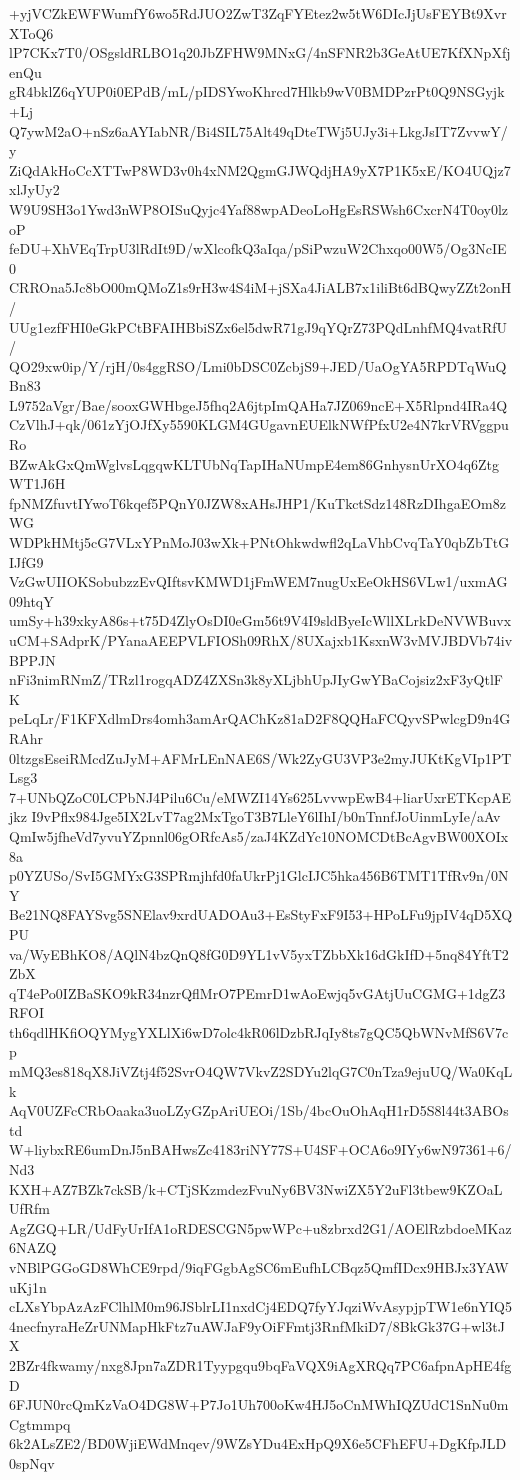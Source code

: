 +yjVCZkEWFWumfY6wo5RdJUO2ZwT3ZqFYEtez2w5tW6DIcJjUsFEYBt9XvrXToQ6
lP7CKx7T0/OSgsldRLBO1q20JbZFHW9MNxG/4nSFNR2b3GeAtUE7KfXNpXfjenQu
gR4bklZ6qYUP0i0EPdB/mL/pIDSYwoKhrcd7Hlkb9wV0BMDPzrPt0Q9NSGyjk+Lj
Q7ywM2aO+nSz6aAYIabNR/Bi4SIL75Alt49qDteTWj5UJy3i+LkgJsIT7ZvvwY/y
ZiQdAkHoCcXTTwP8WD3v0h4xNM2QgmGJWQdjHA9yX7P1K5xE/KO4UQjz7xlJyUy2
W9U9SH3o1Ywd3nWP8OISuQyjc4Yaf88wpADeoLoHgEsRSWsh6CxcrN4T0oy0lzoP
feDU+XhVEqTrpU3lRdIt9D/wXlcofkQ3aIqa/pSiPwzuW2Chxqo00W5/Og3NcIE0
CRROna5Jc8bO00mQMoZ1s9rH3w4S4iM+jSXa4JiALB7x1iliBt6dBQwyZZt2onH/
UUg1ezfFHI0eGkPCtBFAIHBbiSZx6el5dwR71gJ9qYQrZ73PQdLnhfMQ4vatRfU/
QO29xw0ip/Y/rjH/0s4ggRSO/Lmi0bDSC0ZcbjS9+JED/UaOgYA5RPDTqWuQBn83
L9752aVgr/Bae/sooxGWHbgeJ5fhq2A6jtpImQAHa7JZ069ncE+X5Rlpnd4IRa4Q
CzVlhJ+qk/061zYjOJfXy5590KLGM4GUgavnEUElkNWfPfxU2e4N7krVRVggpuRo
BZwAkGxQmWglvsLqgqwKLTUbNqTapIHaNUmpE4em86GnhysnUrXO4q6ZtgWT1J6H
fpNMZfuvtIYwoT6kqef5PQnY0JZW8xAHsJHP1/KuTkctSdz148RzDIhgaEOm8zWG
WDPkHMtj5cG7VLxYPnMoJ03wXk+PNtOhkwdwfl2qLaVhbCvqTaY0qbZbTtGIJfG9
VzGwUIIOKSobubzzEvQIftsvKMWD1jFmWEM7nugUxEeOkHS6VLw1/uxmAG09htqY
umSy+h39xkyA86s+t75D4ZlyOsDI0eGm56t9V4I9sldByeIcWllXLrkDeNVWBuvx
uCM+SAdprK/PYanaAEEPVLFIOSh09RhX/8UXajxb1KsxnW3vMVJBDVb74ivBPPJN
nFi3nimRNmZ/TRzl1rogqADZ4ZXSn3k8yXLjbhUpJIyGwYBaCojsiz2xF3yQtlFK
peLqLr/F1KFXdlmDrs4omh3amArQAChKz81aD2F8QQHaFCQyvSPwlcgD9n4GRAhr
0ltzgsEseiRMcdZuJyM+AFMrLEnNAE6S/Wk2ZyGU3VP3e2myJUKtKgVIp1PTLsg3
7+UNbQZoC0LCPbNJ4Pilu6Cu/eMWZI14Ys625LvvwpEwB4+liarUxrETKcpAEjkz
I9vPflx984Jge5IX2LvT7ag2MxTgoT3B7LleY6lIhI/b0nTnnfJoUinmLyIe/aAv
QmIw5jfheVd7yvuYZpnnl06gORfcAs5/zaJ4KZdYc10NOMCDtBcAgvBW00XOIx8a
p0YZUSo/SvI5GMYxG3SPRmjhfd0faUkrPj1GlcIJC5hka456B6TMT1TfRv9n/0NY
Be21NQ8FAYSvg5SNElav9xrdUADOAu3+EsStyFxF9I53+HPoLFu9jpIV4qD5XQPU
va/WyEBhKO8/AQlN4bzQnQ8fG0D9YL1vV5yxTZbbXk16dGkIfD+5nq84YftT2ZbX
qT4ePo0IZBaSKO9kR34nzrQflMrO7PEmrD1wAoEwjq5vGAtjUuCGMG+1dgZ3RFOI
th6qdlHKfiOQYMygYXLlXi6wD7olc4kR06lDzbRJqIy8ts7gQC5QbWNvMfS6V7cp
mMQ3es818qX8JiVZtj4f52SvrO4QW7VkvZ2SDYu2lqG7C0nTza9ejuUQ/Wa0KqLk
AqV0UZFcCRbOaaka3uoLZyGZpAriUEOi/1Sb/4bcOuOhAqH1rD5S8l44t3ABOstd
W+liybxRE6umDnJ5nBAHwsZc4183riNY77S+U4SF+OCA6o9IYy6wN97361+6/Nd3
KXH+AZ7BZk7ckSB/k+CTjSKzmdezFvuNy6BV3NwiZX5Y2uFl3tbew9KZOaLUfRfm
AgZGQ+LR/UdFyUrIfA1oRDESCGN5pwWPc+u8zbrxd2G1/AOElRzbdoeMKaz6NAZQ
vNBlPGGoGD8WhCE9rpd/9iqFGgbAgSC6mEufhLCBqz5QmfIDcx9HBJx3YAWuKj1n
cLXsYbpAzAzFClhlM0m96JSblrLI1nxdCj4EDQ7fyYJqziWvAsypjpTW1e6nYIQ5
4necfnyraHeZrUNMapHkFtz7uAWJaF9yOiFFmtj3RnfMkiD7/8BkGk37G+wl3tJX
2BZr4fkwamy/nxg8Jpn7aZDR1Tyypgqu9bqFaVQX9iAgXRQq7PC6afpnApHE4fgD
6FJUN0rcQmKzVaO4DG8W+P7Jo1Uh700oKw4HJ5oCnMWhIQZUdC1SnNu0mCgtmmpq
6k2ALsZE2/BD0WjiEWdMnqev/9WZsYDu4ExHpQ9X6e5CFhEFU+DgKfpJLD0spNqv
